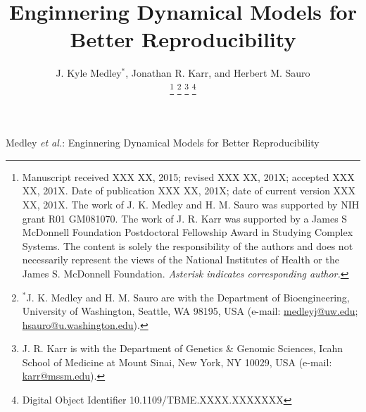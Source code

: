 \documentclass[journal,transmag,twoside]{IEEEtran}
\newcommand{\email}[1]{\href{mailto:#1}{#1}}
\begin{document}
\title{Enginnering Dynamical Models for Better Reproducibility}

\author{
    J. Kyle Medley$^*$,
	Jonathan R. Karr, and
	Herbert M. Sauro
    
    \thanks{
        Manuscript received XXX XX, 2015; revised XXX XX, 201X; accepted XXX XX, 201X. Date of publication XXX XX, 201X; date of current version XXX XX, 201X.
        The work of J. K. Medley and H. M. Sauro was supported by NIH grant R01 GM081070. The work of J. R. Karr was supported by a James S McDonnell Foundation Postdoctoral Fellowship Award in Studying Complex Systems. The content is solely the responsibility of the authors and does not necessarily represent the views of the National Institutes of Health or the James S. McDonnell Foundation.
        \textit{Asterisk indicates corresponding author.}
    }
    \thanks{$^*$J. K. Medley and H. M. Sauro are with the Department of Bioengineering, University of Washington, Seattle, WA 98195, USA (e-mail: \email{medleyj@uw.edu}; \email{hsauro@u.washington.edu}).}
    \thanks{J. R. Karr is with the Department of Genetics \& Genomic Sciences, Icahn School of Medicine at Mount Sinai, New York, NY 10029, USA (e-mail: \email{karr@mssm.edu}).}
    \thanks{Digital Object Identifier 10.1109/TBME.XXXX.XXXXXXX}
}

%
{Medley \MakeLowercase{\textit{et al.}}: Enginnering Dynamical Models for Better Reproducibility}
% 








\maketitle
\end{document}
